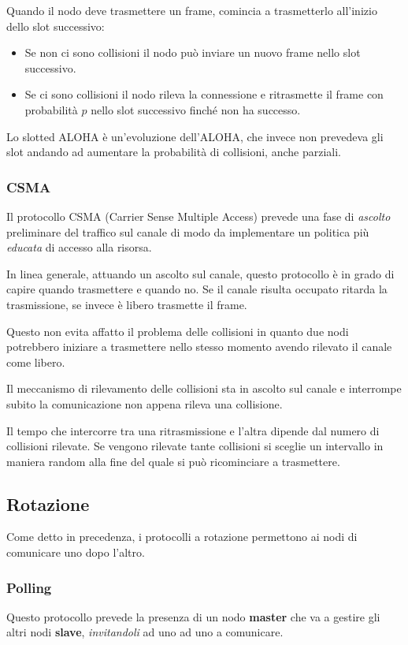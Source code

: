 Quando il nodo deve trasmettere un frame, comincia a trasmetterlo
all'inizio dello slot successivo:
\begin{itemize}
	\item Se non ci sono collisioni il nodo può inviare un nuovo
		frame nello slot successivo.
	\item Se ci sono collisioni il nodo rileva la connessione e 
		ritrasmette il frame con probabilità $p$ nello slot successivo
		finché non ha successo.
\end{itemize}
Lo slotted ALOHA è un'evoluzione dell'ALOHA, che invece non prevedeva
gli slot andando ad aumentare la probabilità di collisioni, anche 
parziali.

\subsubsection{CSMA}
Il protocollo CSMA (Carrier Sense Multiple Access) prevede una fase di
\emph{ascolto} preliminare del traffico sul canale di modo da 
implementare un politica più \emph{educata} di accesso alla risorsa.

In linea generale, attuando un ascolto sul canale, questo protocollo è
in grado di capire quando trasmettere e quando no. Se il canale risulta
occupato ritarda la trasmissione, se invece è libero trasmette il 
frame.

Questo non evita affatto il problema delle collisioni in quanto due
nodi potrebbero iniziare a trasmettere nello stesso momento avendo 
rilevato il canale come libero.

Il meccanismo di rilevamento delle collisioni sta in ascolto sul
canale e interrompe subito la comunicazione non appena rileva una
collisione.

Il tempo che intercorre tra una ritrasmissione e l'altra dipende dal
numero di collisioni rilevate. Se vengono rilevate tante collisioni 
si sceglie un intervallo in maniera random alla fine del quale si può
ricominciare a trasmettere.

\subsection{Rotazione}
Come detto in precedenza, i protocolli a rotazione permettono ai nodi
di comunicare uno dopo l'altro.

\subsubsection{Polling}
Questo protocollo prevede la presenza di un nodo \textbf{master} che 
va a gestire gli altri nodi \textbf{slave}, \emph{invitandoli} ad uno
ad uno a comunicare.

